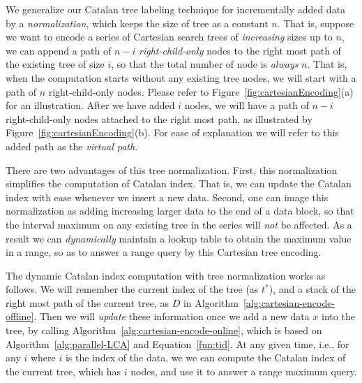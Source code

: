 We generalize our Catalan tree labeling technique for incrementally
added data by a {\em normalization}, which keeps the size of tree as a
constant $n$.  That is, suppose we want to encode a series of
Cartesian search trees of {\em increasing} sizes up to $n$, we can
append a path of $n-i$ {\em right-child-only} nodes to the right most
path of the existing tree of size $i$, so that the total number of
node is {\em always} $n$.  That is, when the computation starts
without any existing tree nodes, we will start with a path of $n$
right-child-only nodes.  Please refer to
Figure~\ref{fig:cartesianEncoding}(a) for an illustration.  After we
have added $i$ nodes, we will have a path of $n - i$ right-child-only
nodes attached to the right most path, as illustrated by
Figure~\ref{fig:cartesianEncoding}(b).  For ease of explanation we
will refer to this added path as the {\em virtual path}.

\begin{figure*}[!thb]
  \centering {}  
  \caption{Normalization of Cartiesan trees of increasing sizes by
    adding a virtual path.}
  \label{fig:cartesianEncoding}
\end{figure*}

There are two advantages of this tree normalization.  First, this
normalization simplifies the computation of Catalan index.  That is,
we can update the Catalan index with ease whenever we insert a new
data.  Second, one can image this normalization as adding increasing
larger data to the end of a data block, so that the interval maximum
on any existing tree in the series will {\em not} be affected.  As a
result we can {\em dynamically} maintain a lookup table to obtain the
maximum value in a range, so as to answer a range query by this
Cartesian tree encoding.


The dynamic Catalan index computation with tree normalization works as
follows.  We will remember the current index of the tree (as $t^*$),
and a stack of the right most path of the current tree, as $D$ in
Algorithm~\ref{alg:cartesian-encode-offline}.  Then we will {\em
  update} these information once we add a new data $x$ into the tree,
by calling Algorithm~\ref{alg:cartesian-encode-online}, which is based
on Algorithm~\ref{alg:parallel-LCA} and Equation~\ref{fun:tid}.  At
any given time, i.e., for any $i$ where $i$ is the index of the data,
we we can compute the Catalan index of the current tree, which has $i$
nodes, and use it to answer a range maximum query.

